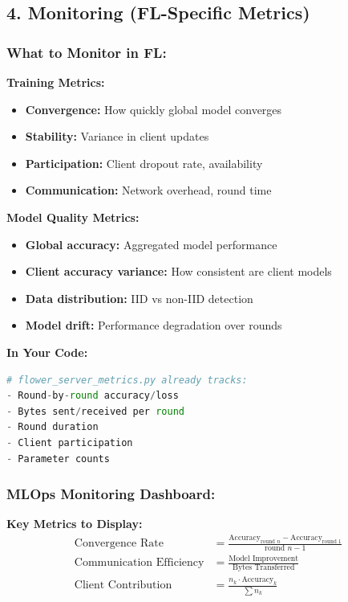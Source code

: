 \documentclass[12pt]{article}
\begin{document}
\subsection{4. Monitoring (FL-Specific Metrics)}

\subsubsection{What to Monitor in FL:}

\textbf{Training Metrics:}
\begin{itemize}
    \item \textbf{Convergence:} How quickly global model converges
    \item \textbf{Stability:} Variance in client updates
    \item \textbf{Participation:} Client dropout rate, availability
    \item \textbf{Communication:} Network overhead, round time
\end{itemize}

\textbf{Model Quality Metrics:}
\begin{itemize}
    \item \textbf{Global accuracy:} Aggregated model performance
    \item \textbf{Client accuracy variance:} How consistent are client models
    \item \textbf{Data distribution:} IID vs non-IID detection
    \item \textbf{Model drift:} Performance degradation over rounds
\end{itemize}

\textbf{In Your Code:}
\begin{lstlisting}[language=Python]
# flower_server_metrics.py already tracks:
- Round-by-round accuracy/loss
- Bytes sent/received per round
- Round duration
- Client participation
- Parameter counts
\end{lstlisting}

\subsubsection{MLOps Monitoring Dashboard:}

\textbf{Key Metrics to Display:}
\[
\begin{aligned}
\text{Convergence Rate} &= \frac{\text{Accuracy}_{\text{round }n} - \text{Accuracy}_{\text{round }1}}{\text{round }n - 1} \\
\text{Communication Efficiency} &= \frac{\text{Model Improvement}}{\text{Bytes Transferred}} \\
\text{Client Contribution} &= \frac{n_k \cdot \text{Accuracy}_k}{\sum n_k}
\end{aligned}
\]
\end{document}
